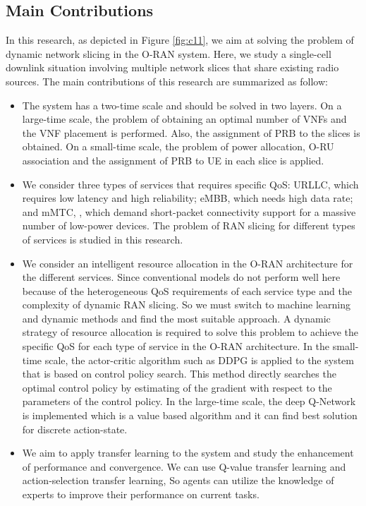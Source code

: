\documentclass{article}
\begin{document}
\subsection{Main Contributions}
In this research, as depicted in Figure \ref{fig:c11}, we aim at solving the problem of dynamic network slicing in the O-RAN system. 
Here, we study a single-cell downlink situation involving multiple network slices that share existing radio sources.
The main contributions of
this research are summarized as follow:
\begin{itemize}
\item 
The system has a two-time scale and should be solved in two layers. On a large-time scale, the problem of obtaining an optimal number of VNFs and the VNF placement is performed. Also, the assignment of PRB to the slices is obtained. On a small-time scale, the problem of power allocation, O-RU association and the assignment of PRB to UE in each slice is applied.
\item 
We consider three types of services that requires specific QoS: URLLC, which requires low latency and high reliability; eMBB, which needs high data rate; and mMTC, , which demand short-packet connectivity support for a massive number of low-power devices.
The problem of RAN slicing for different types of services is studied in this research.

\item 
We consider an intelligent resource allocation in the O-RAN architecture for the different services. Since conventional models do not perform well here because of the heterogeneous QoS requirements of each service type and the complexity of dynamic RAN slicing. So we must switch to machine learning and dynamic methods and find the most suitable approach.  
A dynamic strategy of resource allocation is required to solve this problem to achieve the specific QoS for each type of service in the O-RAN architecture.
 In the small-time scale, the actor-critic algorithm such as DDPG is applied to the system that is based on control policy search. This method directly searches the optimal control policy
by estimating of the gradient with respect to the parameters
of the control policy. In the large-time scale, the deep Q-Network is implemented which is a value based algorithm and it can find best solution for discrete action-state.
\item 
We aim to apply transfer learning to the system and study the enhancement of performance and convergence. We can use Q-value transfer learning and action-selection transfer learning, So agents can utilize the knowledge of experts to improve their performance on current tasks\cite{zhou2021learning}. 
\end{itemize}
\end{document}
